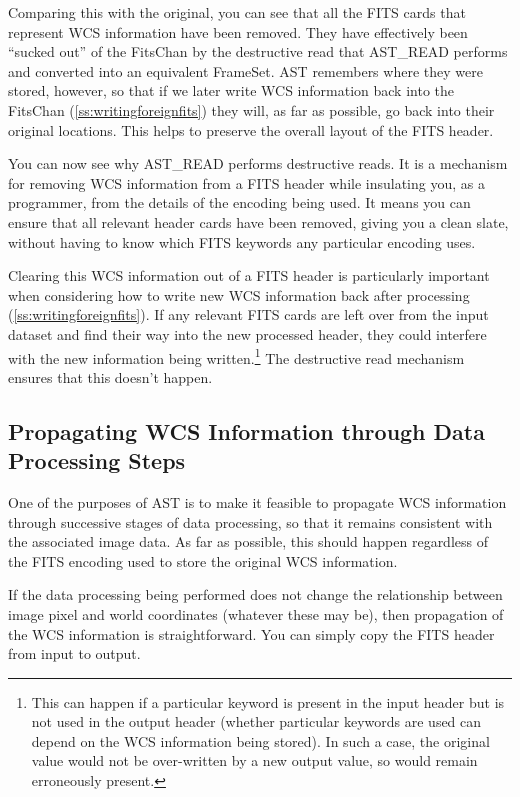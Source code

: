 \documentclass[twoside,11pt]{article}
\newcommand{\htmlref}[2]{#1}
\newcommand{\secref}[1]{\S\ref{#1}}
\renewcommand{\secref}[1]{\ref{#1}}
\begin{document}
Comparing this with the original, you can see that all the FITS cards
that represent WCS information have been removed. They have
effectively been ``sucked out'' of the FitsChan by the destructive
read that \htmlref{AST\_READ}{AST_READ} performs and converted into an equivalent
FrameSet. AST remembers where they were stored, however, so that if we
later write WCS information back into the FitsChan
(\secref{ss:writingforeignfits}) they will, as far as possible, go
back into their original locations.  This helps to preserve the
overall layout of the FITS header.

You can now see why AST\_READ performs destructive reads. It is a
mechanism for removing WCS information from a FITS header while
insulating you, as a programmer, from the details of the encoding
being used. It means you can ensure that all relevant header cards
have been removed, giving you a clean slate, without having to know
which FITS keywords any particular encoding uses.

Clearing this WCS information out of a FITS header is particularly
important when considering how to write new WCS information back after
processing (\secref{ss:writingforeignfits}). If any relevant FITS
cards are left over from the input dataset and find their way into the
new processed header, they could interfere with the new information
being written.\footnote{This can happen if a particular keyword is
present in the input header but is not used in the output header
(whether particular keywords are used can depend on the WCS
information being stored). In such a case, the original value would
not be over-written by a new output value, so would remain erroneously
present.} The destructive read mechanism ensures that this doesn't
happen.

\subsection{\label{ss:propagatingwcsinformation}Propagating WCS Information through Data Processing Steps}

One of the purposes of AST is to make it feasible to propagate WCS
information through successive stages of data processing, so that it
remains consistent with the associated image data. As far as possible,
this should happen regardless of the FITS encoding used to store the
original WCS information.

If the data processing being performed does not change the
relationship between image pixel and world coordinates (whatever these
may be), then propagation of the WCS information is
straightforward. You can simply copy the FITS header from input to
output.
\end{document}

